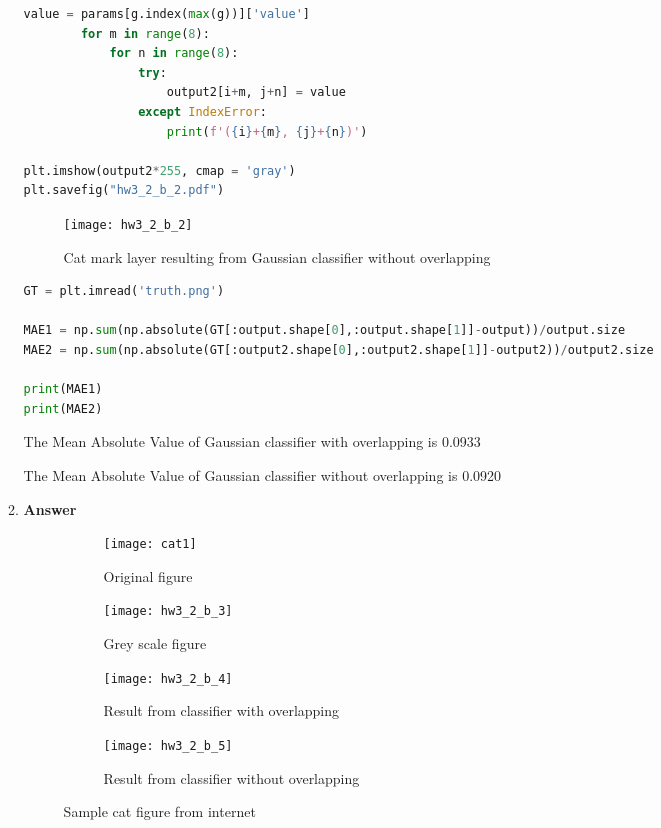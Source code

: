 \documentclass[11pt]{article}
\begin{document}
\begin{enumerate}[label=(\alph*)]
\begin{enumerate}[label=(\roman*)]
\begin{lstlisting}[language=Python, showstringspaces=false]
        value = params[g.index(max(g))]['value']
        for m in range(8):
            for n in range(8):
                try:
                    output2[i+m, j+n] = value
                except IndexError:
                    print(f'({i}+{m}, {j}+{n})')
        
plt.imshow(output2*255, cmap = 'gray')  
plt.savefig("hw3_2_b_2.pdf")    
\end{lstlisting}

\begin{figure}[H]
\centering
\texttt{[image: hw3\_2\_b\_2]}
\caption{Cat mark layer resulting from Gaussian classifier without overlapping}
\label{fig:hw3_2_b_2}
\end{figure}

\begin{lstlisting}[language=Python, showstringspaces=false]
GT = plt.imread('truth.png')          

MAE1 = np.sum(np.absolute(GT[:output.shape[0],:output.shape[1]]-output))/output.size
MAE2 = np.sum(np.absolute(GT[:output2.shape[0],:output2.shape[1]]-output2))/output2.size

print(MAE1)
print(MAE2)
\end{lstlisting}

The Mean Absolute Value of Gaussian classifier with overlapping is 0.0933

The Mean Absolute Value of Gaussian classifier without overlapping is 0.0920

\newpage

\item  \textbf{Answer}

\begin{figure}[H]
\begin{subfigure}{.5\textwidth}
  \centering
  \texttt{[image: cat1]}
  \caption{Original figure}
  \label{}
\end{subfigure}
\begin{subfigure}{.5\textwidth}
  \centering
  \texttt{[image: hw3\_2\_b\_3]}
  \caption{Grey scale figure}
  \label{fig:hw3_2_b_3}
\end{subfigure}

\begin{subfigure}{.5\textwidth}
  \centering
  \texttt{[image: hw3\_2\_b\_4]}
  \caption{Result from classifier with overlapping}
  \label{fig:hw3_2_b_4}
\end{subfigure}
\begin{subfigure}{.5\textwidth}
  \centering
  \texttt{[image: hw3\_2\_b\_5]}
  \caption{Result from classifier without overlapping}
  \label{fig:hw3_2_b_5}
\end{subfigure}
\caption{Sample cat figure from internet}
\label{fig:fig3}
\end{figure}


\end{enumerate}
\end{enumerate}
\end{document}
